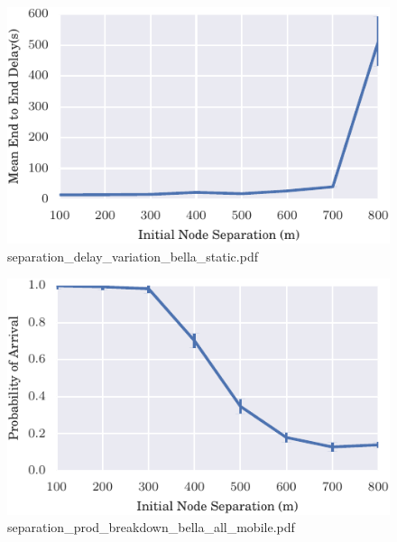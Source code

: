 \documentclass{article}
\begin{document}
\begin{figure}[h!]
\centering
\includegraphics[width=\linewidth]{separation_delay_variation_bella_static.pdf}
\caption{separation\_delay\_variation\_bella\_static.pdf}
\end{figure}




\begin{figure}[h!]
\centering
\includegraphics[width=\linewidth]{separation_prod_breakdown_bella_all_mobile.pdf}
\caption{separation\_prod\_breakdown\_bella\_all\_mobile.pdf}
\end{figure}
\end{document}

